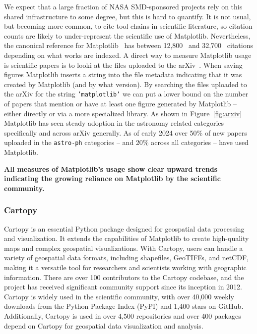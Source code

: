 \documentclass[12pt]{article}
\numberwithin{page}{section}
\begin{document}
We expect that a large fraction of NASA SMD-sponsored projects rely on this
shared infrastructure to some degree, but this is hard to quantify.  It is not
usual, but becoming more common, to cite tool chains in scientific literature,
so citation counts are likely to under-represent the scientific use of
Matplotlib.  Nevertheless, the canonical reference for
Matplotlib~\cite{Hunter:2007} has between 12,800~\cite{ads_mpl} and
32,700~\cite{gs_cites} citations depending on what works are indexed.  A direct
way to measure Matplotlib usage is scientific papers is to looki at the files
uploaded to the arXiv~\cite{arxiv_stats}.  When saving figures Matplotlib
inserts a string into the file metadata indicating that it was created by
Matplotlib (and by what version).  By searching the files uploaded to the arXiv
for the string \texttt{'matplotlib'} we can put a lower bound
on the number of papers that mention or have at least one figure generated by
Matplotlib -- either directly or via a more specialized library.  As shown in
Figure~\ref{fig:arxiv} Matplotlib has seen steady adoption in the astronomy
related categories specifically and across arXiv generally.  As of early 2024
over 50\% of new papers uploaded in the \texttt{astro-ph} categories -- and
20\% across all categories -- have used Matplotlib.

\textbf{All measures of Matplotlib's usage show clear upward trends indicating the
growing reliance on Matplotlib by the scientific community.}

\subsubsection{Cartopy}



Cartopy is an essential Python package designed for geospatial data processing and visualization.
It extends the capabilities of Matplotlib
to create high-quality maps and complex geospatial visualizations.
With Cartopy, users can handle a variety of geospatial data formats,
including shapefiles, GeoTIFFs, and netCDF,
making it a versatile tool for researchers and scientists working with geographic information.
There are over 100 contributors to the Cartopy codebase, and the project has received
significant community support since its inception in 2012. Cartopy is widely used in the
scientific community, with over 40,000 weekly downloads from the Python Package Index (PyPI)
and 1,400 stars on GitHub. Additionally, Cartopy is used in over 4,500 repositories and
over 400 packages depend on Cartopy for geospatial data visualization and analysis.
\end{document}
